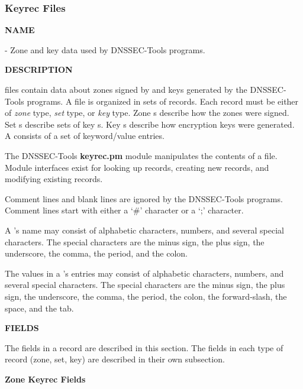 \clearpage

\subsubsection{Keyrec Files}

{\bf NAME}

 - Zone and key data used by DNSSEC-Tools programs.

{\bf DESCRIPTION}

 files contain data about zones signed by and keys generated by
the DNSSEC-Tools programs.  A  file is organized in sets of
 records.  Each  record must be either of {\it
zone} type, {\it set} type, or {\it key} type.  Zone s describe
how the zones were signed.  Set s describe sets of key
s.  Key s describe how encryption keys were
generated.  A  consists of a set of keyword/value entries.

The DNSSEC-Tools {\bf keyrec.pm} module manipulates the contents of a
 file.  Module interfaces exist for looking up 
records, creating new records, and modifying existing records.

Comment lines and blank lines are ignored by the DNSSEC-Tools programs.
Comment lines start with either a `\#' character or a `;' character.

A 's name may consist of alphabetic characters, numbers, and
several special characters.  The special characters are the minus sign, the
plus sign, the underscore, the comma, the period, and the colon.

The values in a 's entries may consist of alphabetic characters,
numbers, and several special characters.  The special characters are the minus
sign, the plus sign, the underscore, the comma, the period, the colon, the
forward-slash, the space, and the tab.

{\bf FIELDS}

The fields in a  record are described in this section.  The
fields in each type of record (zone, set, key) are described in their own
subsection.

{\bf Zone Keyrec Fields}

